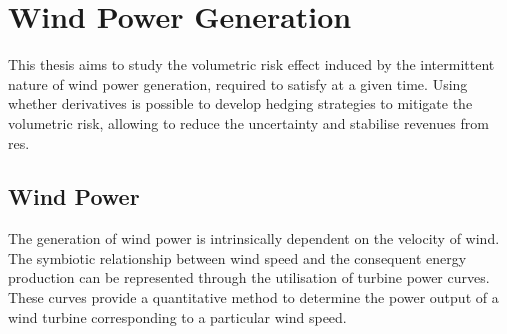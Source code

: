 

%

\chapter{Wind Power Generation}
\label{ch:wind_power_generation}

    This thesis aims to study the volumetric risk effect induced by the intermittent nature of wind power generation,
    required to satisfy at a given time.
    Using whether derivatives is possible to develop hedging strategies to mitigate the volumetric risk,
    allowing to reduce the uncertainty and stabilise revenues from \gls{res}.


%

\section{Wind Power}
    \label{sec:wind_power}

    The generation of wind power is intrinsically dependent on the velocity of wind.
    The symbiotic relationship between wind speed and the consequent energy production can be represented through the
    utilisation of turbine power curves.
    These curves provide a quantitative method
    to determine the power output of a wind turbine corresponding to a particular wind speed.

